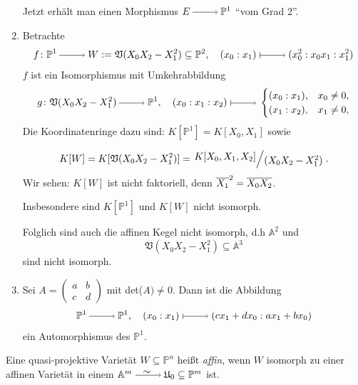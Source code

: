 \documentclass[a4paper,12pt,index=toc]{scrbook}
\theoremstyle{keinenummern} %
\def\A{\mathbb{A}}
\def\V{\mathfrak{V}}
\def\P{\mathbb{P}}
\def\U{\mathfrak{U}}
\newcommand{\da}{:=}
\def\Bar#1{\ensuremath\overline{#1}}
\begin{document}
\begin{bsp}
\begin{enumerate}
Jetzt erhält man einen Morphismus $E\ra \P^1$ \enquote{vom Grad $2$}.
  \item{} Betrachte
\begin{equation*}f\colon \P^1\ra W\da\V(X_0X_2-X_1^2)\subseteq \P^2, \quad (x_0:x_1)\mapsto (x_0^2:x_0x_1:x_1^2)\end{equation*}
$f$ ist ein Isomorphismus mit Umkehrabbildung
\begin{equation*}g\colon\V(X_0X_2-X_1^2)\ra \P^1, \quad (x_0:x_1:x_2)\mapsto \begin{cases} (x_0:x_1), &x_0 \neq 0,\\(x_1:x_2), &x_1 \neq 0, \end{cases} \end{equation*}
Die Koordinatenringe dazu sind: $K[\P^1]=K[X_0,X_1]$ sowie

\begin{equation*}K[W]=K[\V(X_0X_2-X_1^2)]=\Quotient{K[X_0,X_1,X_2]}{(X_0X_2-X_1^2)}.\end{equation*}
Wir sehen: $K[W]$ ist nicht faktoriell, denn $\Bar{X_1}^2=\Bar{X_0}\Bar{X_2}$.

Insbesondere sind $K[\P^1]$ und $K[W]$ nicht isomorph.

Folglich sind auch die affinen Kegel nicht isomorph, d.h $\A^2$ und \begin{equation*}\V(X_0X_2-X_1^2)\subseteq \A^3\end{equation*} sind nicht isomorph.
  \item{} Sei $A=\begin{pmatrix} a&b\\c&d \end{pmatrix}$ mit det($A)\neq 0$. Dann ist die Abbildung 
\begin{equation*}\P^1\ra \P^1, \quad (x_0:x_1)\mapsto (cx_1+dx_0:ax_1+bx_0)\end{equation*}
ein Automorphismus des $\P^1$.
\end{enumerate}
\end{bsp}

\begin{dfn}\label{2.6.4}
Eine quasi-projektive Varietät $W\subseteq \P^n$ heißt \emph{affin}, wenn $W$ isomorph zu einer affinen Varietät in einem $\A^m \isom \U_0\subseteq \P^m$ ist.
\end{dfn}
\end{document}
